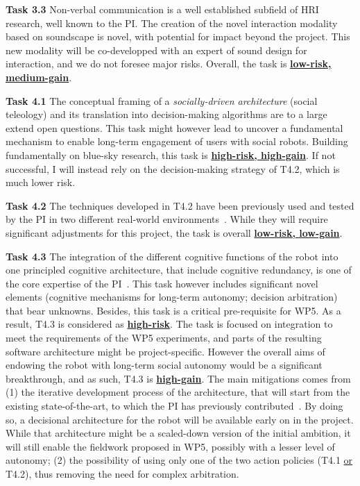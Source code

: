 \textbf{Task 3.3} Non-verbal communication is a well established subfield of HRI
research, well known to the PI. The creation of the novel interaction modality
based on soundscape is novel, with potential for impact beyond the project. This
new modality will be co-developped with an expert of sound design for
interaction, and we do not foresee major risks. Overall, the task is \ul{\bf
low-risk, medium-gain}.

\vspace{1em}

\textbf{Task 4.1} The conceptual framing of a \emph{socially-driven
architecture} (social teleology) and its translation into decision-making
algorithms are to a large extend open questions. This task might however lead to
uncover a fundamental mechanism to enable long-term engagement of users
with social robots. Building fundamentally on blue-sky research, this task is
\ul{\bf high-risk, high-gain}. If not successful, I will instead rely on the
decision-making strategy of T4.2, which is much lower risk.

\textbf{Task 4.2} The techniques developed in T4.2 have been previously used and
tested by the PI in two different real-world
environments~. While they will require
significant adjustments for this project, the task is overall \ul{\bf low-risk,
low-gain}.

\textbf{Task 4.3} The integration of the different cognitive functions of the
robot into one principled cognitive architecture, that include cognitive
redundancy, is one of the core expertise of the
PI~. This task however includes significant novel
elements (cognitive mechanisms for long-term autonomy; decision arbitration)
that bear unknowns. Besides, this task is a critical pre-requisite for WP5. As a
result, T4.3 is considered as \ul{\bf high-risk}. The task is focused on
integration to meet the requirements of the WP5 experiments, and parts
of the resulting software architecture might be project-specific. However the
overall aims of endowing the robot with long-term social autonomy would be a
significant breakthrough, and as such, T4.3 is \ul{\bf high-gain}. The main
mitigations comes from (1) the iterative development process of the
architecture, that will start from the existing state-of-the-art, to which the
PI has previously contributed~. By doing so, a
decisional architecture for the robot will be available early on in the project.
While that architecture might be a scaled-down version of the initial ambition,
it will still enable the fieldwork proposed in WP5, possibly with a lesser level
of autonomy; (2) the possibility of using only one of the two action policies
(T4.1 \ul{or} T4.2), thus removing the need for complex arbitration.

